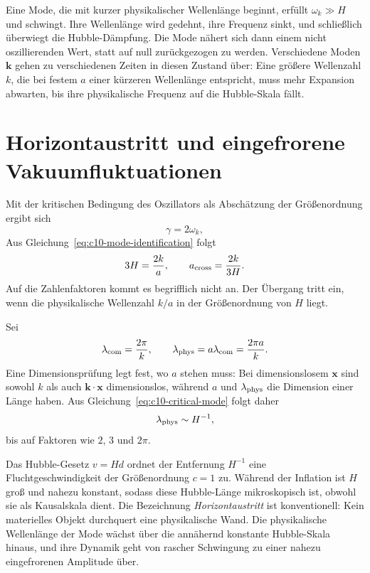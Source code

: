 Eine Mode, die mit kurzer physikalischer Wellenlänge beginnt, erfüllt \(\omega_k\gg H\) und schwingt. Ihre Wellenlänge wird gedehnt, ihre Frequenz sinkt, und schließlich überwiegt die Hubble-Dämpfung. Die Mode nähert sich dann einem nicht oszillierenden Wert, statt auf null zurückgezogen zu werden. Verschiedene Moden \(\mathbf k\) gehen zu verschiedenen Zeiten in diesen Zustand über: Eine größere Wellenzahl \(k\), die bei festem \(a\) einer kürzeren Wellenlänge entspricht, muss mehr Expansion abwarten, bis ihre physikalische Frequenz auf die Hubble-Skala fällt.

\section{Horizontaustritt und eingefrorene Vakuumfluktuationen}

Mit der kritischen Bedingung des Oszillators als Abschätzung der Größenordnung ergibt sich
\[
\gamma=2\omega_k,
\]
Aus Gleichung~\eqref{eq:c10-mode-identification} folgt
\begin{equation}
3H=\frac{2k}{a},
\qquad
a_{\rm cross}=\frac{2k}{3H}.
\label{eq:c10-critical-mode}
\end{equation}
Auf die Zahlenfaktoren kommt es begrifflich nicht an. Der Übergang tritt ein, wenn die physikalische Wellenzahl \(k/a\) in der Größenordnung von \(H\) liegt.

Sei
\[
\lambda_{\rm com}=\frac{2\pi}{k},
\qquad
\lambda_{\rm phys}=a\lambda_{\rm com}
=\frac{2\pi a}{k}.
\]
Eine Dimensionsprüfung legt fest, wo \(a\) stehen muss: Bei dimensionslosem \(\mathbf x\) sind sowohl \(k\) als auch \(\mathbf k\cdot\mathbf x\) dimensionslos, während \(a\) und \(\lambda_{\rm phys}\) die Dimension einer Länge haben. Aus Gleichung~\eqref{eq:c10-critical-mode} folgt daher
\begin{equation}
\lambda_{\rm phys}\sim H^{-1},
\label{eq:c10-horizon-crossing}
\end{equation}
bis auf Faktoren wie \(2\), \(3\) und \(2\pi\).

Das Hubble-Gesetz \(v=Hd\) ordnet der Entfernung \(H^{-1}\) eine Fluchtgeschwindigkeit der Größenordnung \(c=1\) zu. Während der Inflation ist \(H\) groß und nahezu konstant, sodass diese Hubble-Länge mikroskopisch ist, obwohl sie als Kausalskala dient. Die Bezeichnung \emph{Horizontaustritt} ist konventionell: Kein materielles Objekt durchquert eine physikalische Wand. Die physikalische Wellenlänge der Mode wächst über die annähernd konstante Hubble-Skala hinaus, und ihre Dynamik geht von rascher Schwingung zu einer nahezu eingefrorenen Amplitude über.

